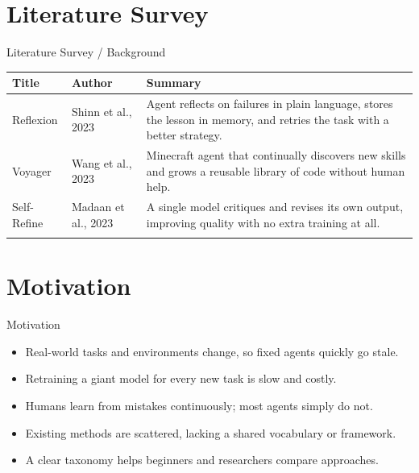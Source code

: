 \documentclass[10pt]{beamer}
\begin{document}
\section{Literature Survey}
\begin{frame}{Literature Survey / Background}
  \small
  \begin{tabular}{@{}p{2.7cm}p{2.3cm}p{5.6cm}@{}}
    \toprule
    \textbf{Title} & \textbf{Author} & \textbf{Summary} \\
    \midrule
    Reflexion & Shinn et al., 2023 & Agent reflects on failures in plain language, stores the lesson in memory, and retries the task with a better strategy. \\
    \addlinespace
    Voyager & Wang et al., 2023 & Minecraft agent that continually discovers new skills and grows a reusable library of code without human help. \\
    \addlinespace
    Self-Refine & Madaan et al., 2023 & A single model critiques and revises its own output, improving quality with no extra training at all. \\
    \addlinespace
    \bottomrule
  \end{tabular}
\end{frame}
\section{Motivation}
\begin{frame}{Motivation}
\begin{itemize}
  \item Real-world tasks and environments change, so fixed agents quickly go stale.
  \item Retraining a giant model for every new task is slow and costly.
  \item Humans learn from mistakes continuously; most agents simply do not.
  \item Existing methods are scattered, lacking a shared vocabulary or framework.
  \item A clear taxonomy helps beginners and researchers compare approaches.
\end{itemize}
\end{frame}
\end{document}
